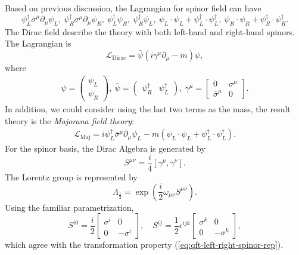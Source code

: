 Based on previous discussion, the Lagrangian for spinor field can have
\begin{equation}
	\psi_L^\dagger \bar\sigma^\mu \partial_\mu \psi_L,\ 
	\psi_R^\dagger \sigma^\mu \partial_\mu \psi_R,\ 
	\psi_L^\dagger \psi_R,\ \psi_R^\dagger \psi_L,\ 
	\psi_L \cdot \psi_L + \psi_L^\dagger \cdot \psi_L^\dagger,\ 
	\psi_R \cdot \psi_R + \psi_R^\dagger \cdot \psi_R^\dagger.
\end{equation}
The Dirac field describe the theory with both left-hand and right-hand spinors.
The Lagrangian is
\begin{equation}
	\mathcal{L}_{\mathrm{Dirac}}
	= \bar\psi \left(i\gamma^\mu \partial_\mu - m\right)\psi,
\end{equation}
where
\begin{eqnarray}
	\psi = \begin{pmatrix}
		\psi_L \\ \psi_R
	\end{pmatrix},\ 
	\bar\psi = \begin{pmatrix}
		\psi_R^\dagger & \psi_L^\dagger
	\end{pmatrix},\ 
	\gamma^\mu = \begin{bmatrix}
		0 & \sigma^\mu \\
		\bar\sigma^\mu & 0
	\end{bmatrix}.
\end{eqnarray}
In addition, we could consider using the last two terms as the mass, the result theory is the \textit{Majorana field theory}:
\begin{equation}
\begin{aligned}
	\mathcal{L}_{\mathrm{Maj}}
	= i \psi_L^\dagger \bar\sigma^\mu \partial_\mu  \psi_L -m(\psi_L \cdot \psi_L + \psi_L^\dagger \cdot \psi_L^\dagger).
\end{aligned}
\end{equation} 
For the spinor basis, the Dirac Algebra is generated by
\begin{equation}\label{eq:qft-diract-generator}
	S^{\mu\nu} = \frac{i}{4}[\gamma^\mu, \gamma^\nu].
\end{equation}
The Lorentz group is represented by
\begin{equation}\label{eq:qft-dirac-rep}
	\Lambda_{\frac{1}{2}} = \exp\left(\frac{i}{2}\omega_{\mu\nu} S^{\mu\nu}\right).
\end{equation}
Using the familiar parametrization,
\begin{equation}
	S^{i0} = \frac{i}{2}\left[\begin{array}{cc}
		\sigma^i & 0 \\ 0 & -\sigma^i
	\end{array}\right], \quad 
	S^{ij} = \frac{1}{2}\epsilon^{ijk} \left[\begin{array}{cc}
		\sigma^k & 0 \\ 0 & -\sigma^k
	\end{array}\right],
\end{equation}
which agree with the transformation property (\ref{eq:qft-left-right-spinor-rep}).


